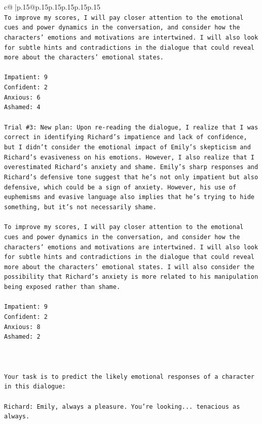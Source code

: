 \documentclass{article}
\begin{document}
{\begin{supertabular}{c@{$\;$}|p{.15\linewidth}@{}p{.15\linewidth}p{.15\linewidth}p{.15\linewidth}p{.15\linewidth}p{.15\linewidth}}
{{{\\ 
\texttt{To improve my scores, I will pay closer attention to the emotional cues and power dynamics in the conversation, and consider how the characters' emotions and motivations are intertwined. I will also look for subtle hints and contradictions in the dialogue that could reveal more about the characters' emotional states.} \\
\\ 
\texttt{Impatient: 9} \\
\texttt{Confident: 2} \\
\texttt{Anxious: 6} \\
\texttt{Ashamed: 4} \\
\\ 
\texttt{Trial \#3: New plan: Upon re{-}reading the dialogue, I realize that I was correct in identifying Richard's impatience and lack of confidence, but I didn't consider the emotional impact of Emily's skepticism and Richard's evasiveness on his emotions. However, I also realize that I overestimated Richard's anxiety and shame. Emily's sharp responses and Richard's defensive tone suggest that he's not only impatient but also defensive, which could be a sign of anxiety. However, his use of euphemisms and evasive language also implies that he's trying to hide something, but it's not necessarily shame. } \\
\\ 
\texttt{To improve my scores, I will pay closer attention to the emotional cues and power dynamics in the conversation, and consider how the characters' emotions and motivations are intertwined. I will also look for subtle hints and contradictions in the dialogue that could reveal more about the characters' emotional states. I will also consider the possibility that Richard's anxiety is more related to his manipulation being exposed rather than shame. } \\
\\ 
\texttt{Impatient: 9} \\
\texttt{Confident: 2} \\
\texttt{Anxious: 8} \\
\texttt{Ashamed: 2} \\
\\ 
\\ 
\\ 
\texttt{Your task is to predict the likely emotional responses of a character in this dialogue:} \\
\\ 
\texttt{Richard: Emily, always a pleasure. You're looking... tenacious as always.} \\
}}}
\end{supertabular}}
\end{document}
